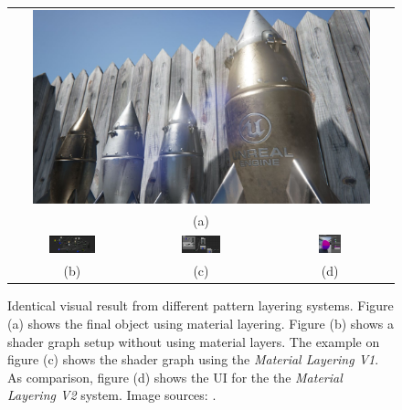 \begin{figure}
	\centering\small 
	\begin{tabular}{@{}ccc@{}}
	\multicolumn{3}{c}{\includegraphics[width=0.9\textwidth]{images/05cha_02_LayeredMaterials.jpg}} \\
	\multicolumn{3}{c}{(a)} \\
	[6pt]	\includegraphics[width=0.39\textwidth]{images/05cha_02_ue4_Rocket_Material_Beforelayers.jpg} &
	\includegraphics[width=0.33\textwidth]{images/05cha_02_ue4_MatieralLayering.jpg} &
	\includegraphics[width=0.19\textwidth]{images/05cha_02_MaterialLayerInstance_RN.jpg}	\\
	(b) & (c) & (d)
	\\[6pt]	
	\end{tabular}

	\caption{Identical visual result from different pattern layering systems. Figure (a) shows the final object using material layering. Figure (b) shows a shader graph setup without using material layers. The example on figure (c) shows the shader graph using the \emph{Material Layering V1}. As comparison, figure (d) shows the UI for the the \emph{Material Layering V2} system. Image sources: \cites{epic2015materialLayers,pesare2017material}.}
	\label{fig:ComparisonRocketLayering}
\end{figure}


